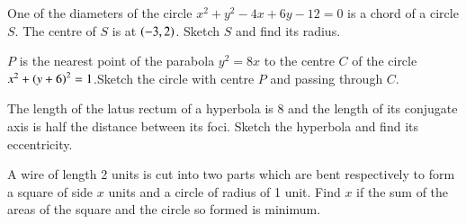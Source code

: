 \documentclass[journal,12pt,onecolumn]{IEEEtran}
\begin{document}
\solution

\begin{problem}
One of the diameters of the  circle $x^2+y^2-4x+6y-12 = 0$ is a chord of a circle $S$. The centre of $S$ is at $\left(-3,2\right)$. Sketch $S$ and find its radius.
\end{problem}
\begin{problem}
$P$ is the nearest point of the parabola $y^2=8x$ to the centre $C$ of the circle $x^2+\left(y+6\right)^2=1$.Sketch the circle with centre $P$ and passing through $C$.
\end{problem}
\solution

\begin{problem}
The length of the latus rectum of a hyperbola is 8 and the length of its conjugate axis is half the distance between its foci.  Sketch the hyperbola and find its eccentricity.
\end{problem}
\begin{problem}
A wire of length 2 units is cut into two parts which are bent respectively to form a square of side $x$ units and a circle of radius of 1 unit. Find $x$ if the sum of the areas of the square and the circle so formed is minimum.
\end{problem}
% 
%
% 

% 
\end{document}

